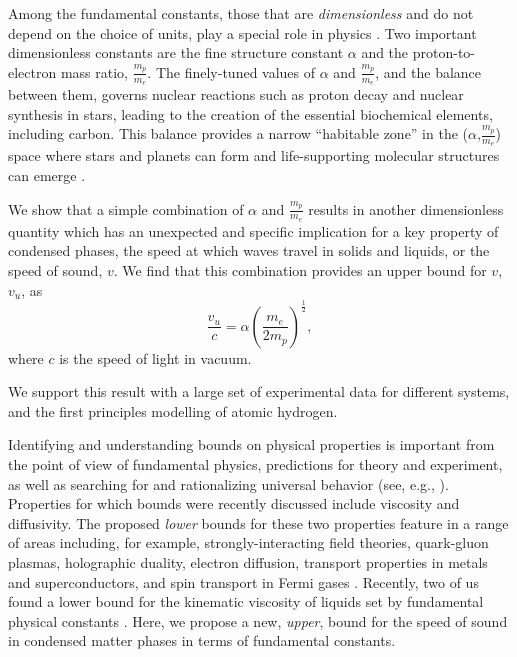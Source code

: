 \documentclass[aps,prl,groupedaddress,fleqn,twocolumn,10pt]{revtex4}
\begin{document}
Among the fundamental constants, those that are {\it dimensionless} and do not depend on the choice of units, play a special role in physics \cite{barrow}. Two important dimensionless constants are the fine structure constant $\alpha$ and the proton-to-electron mass ratio, $\frac{m_p}{m_e}$. The finely-tuned values of $\alpha$ and $\frac{m_p}{m_e}$, and the balance between them, governs nuclear reactions such as proton decay and nuclear synthesis in stars, leading to the creation of the essential biochemical elements, including carbon. This balance provides a narrow ``habitable zone'' in the ($\alpha$,$\frac{m_p}{m_e}$) space where stars and planets can form and life-supporting molecular structures can emerge \cite{barrow}.

We show that a simple combination of $\alpha$ and $\frac{m_p}{m_e}$ results in another dimensionless quantity which has an unexpected and specific implication for a key property of condensed phases, the speed at which waves travel in solids and liquids, or the speed of sound, $v$. We find that this combination provides an upper bound for $v$, $v_u$, as
\begin{equation}
\frac{v_u}{c}=\alpha\left(\frac{m_e}{2m_p}\right)^{\frac{1}{2}},
\label{v0}
\end{equation}
\noindent where $c$ is the speed of light in vacuum.

We support this result with a large set of experimental data for different systems, and the first principles modelling of atomic hydrogen.

Identifying and understanding bounds on physical properties is important from the point of view of fundamental physics, predictions for theory and experiment, as well as searching for and rationalizing universal behavior (see, e.g., \cite{kss,zaanen3,hartnoll,zaanen2,spin,behnia,zaanen1,behnia1,hartnoll1}). Properties for which bounds were recently discussed include viscosity and diffusivity. The proposed {\it lower} bounds for these two properties feature in a range of areas including, for example, strongly-interacting field theories, quark-gluon plasmas, holographic duality, electron diffusion, transport properties in metals and superconductors, and spin transport in Fermi gases \cite{kss,zaanen3,hartnoll,zaanen2,spin,behnia,zaanen1,behnia1,hartnoll1}. Recently, two of us found a lower bound for the kinematic viscosity of liquids set by fundamental physical constants \cite{sciadv}. Here, we propose a new, {\it upper}, bound for the speed of sound in condensed matter phases in terms of fundamental constants.
\end{document}

